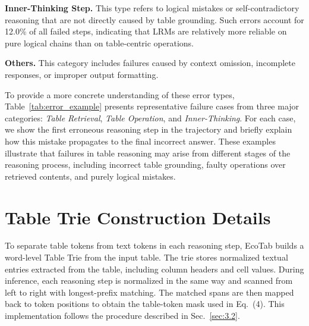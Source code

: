 \documentclass[11pt]{article}
\begin{document}
\textbf{Inner-Thinking Step.}
This type refers to logical mistakes or self-contradictory reasoning that are not directly caused by table grounding. Such errors account for 12.0\% of all failed steps, indicating that LRMs are relatively more reliable on pure logical chains than on table-centric operations.

\textbf{Others.}
This category includes failures caused by context omission, incomplete responses, or improper output formatting.

To provide a more concrete understanding of these error types, Table~\ref{tab:error_example} presents representative failure cases from three major categories: \textit{Table Retrieval}, \textit{Table Operation}, and \textit{Inner-Thinking}. For each case, we show the first erroneous reasoning step in the trajectory and briefly explain how this mistake propagates to the final incorrect answer. These examples illustrate that failures in table reasoning may arise from different stages of the reasoning process, including incorrect table grounding, faulty operations over retrieved contents, and purely logical mistakes.


\vspace{-6pt}

\section{Table Trie Construction Details}
\label{sec:appendix-trie}
\vspace{-4pt}
To separate table tokens from text tokens in each reasoning step, EcoTab builds a word-level Table Trie from the input table. The trie stores normalized textual entries extracted from the table, including column headers and cell values. During inference, each reasoning step is normalized in the same way and scanned from left to right with longest-prefix matching. The matched spans are then mapped back to token positions to obtain the table-token mask used in Eq.~(4). This implementation follows the procedure described in Sec.~\ref{sec:3.2}.
\vspace{-2pt}
\end{document}

